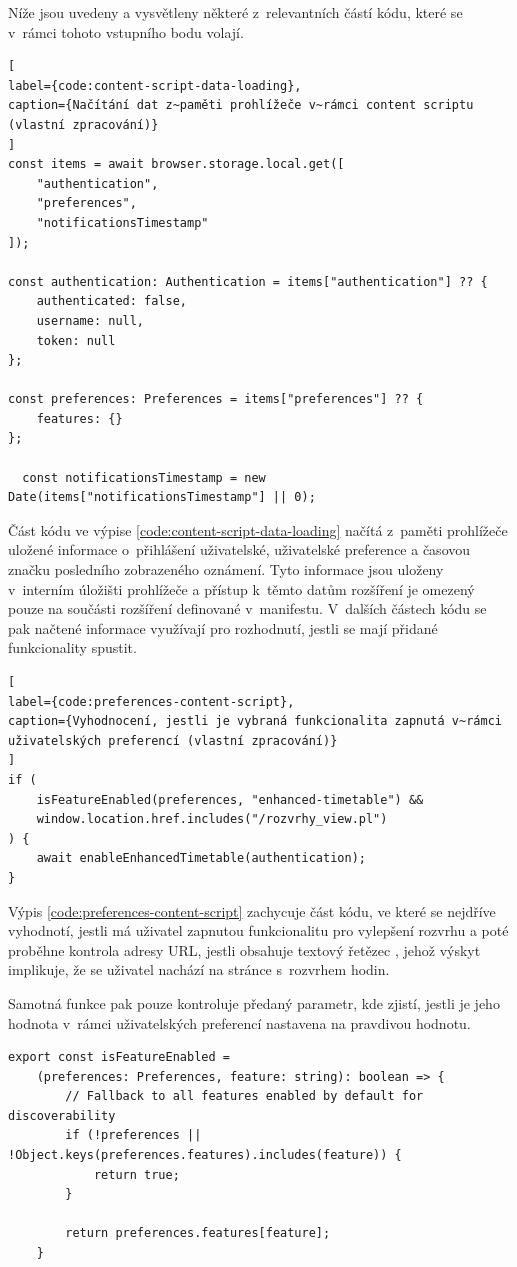 Níže jsou uvedeny a vysvětleny některé z~relevantních částí kódu, které se v~rámci tohoto vstupního bodu volají.

\begin{lstlisting}[
label={code:content-script-data-loading}, 
caption={Načítání dat z~paměti prohlížeče v~rámci content scriptu (vlastní zpracování)}
]
const items = await browser.storage.local.get([
    "authentication",
    "preferences",
    "notificationsTimestamp"
]);

const authentication: Authentication = items["authentication"] ?? {
    authenticated: false,
    username: null,
    token: null
};

const preferences: Preferences = items["preferences"] ?? {
    features: {}
};

  const notificationsTimestamp = new Date(items["notificationsTimestamp"] || 0);
\end{lstlisting}

 Část kódu ve výpise \ref{code:content-script-data-loading} načítá z~paměti prohlížeče uložené informace o~přihlášení uživatelské, uživatelské preference a časovou značku posledního zobrazeného oznámení. Tyto informace jsou uloženy v~interním úložišti prohlížeče a přístup k~těmto datům rozšíření je omezený pouze na součásti rozšíření definované v~manifestu.
V~dalších částech kódu se pak načtené informace využívají pro rozhodnutí, jestli se mají přidané funkcionality spustit.

\begin{lstlisting}[
label={code:preferences-content-script}, 
caption={Vyhodnocení, jestli je vybraná funkcionalita zapnutá v~rámci uživatelských preferencí (vlastní zpracování)}
]
if (
    isFeatureEnabled(preferences, "enhanced-timetable") && 
    window.location.href.includes("/rozvrhy_view.pl")
) {
    await enableEnhancedTimetable(authentication);
}
\end{lstlisting}

Výpis \ref{code:preferences-content-script} zachycuje část kódu, ve které se nejdříve vyhodnotí, jestli má uživatel zapnutou funkcionalitu pro vylepšení rozvrhu a poté proběhne kontrola adresy URL, jestli obsahuje textový řetězec , jehož výskyt implikuje, že se uživatel nachází na stránce s~rozvrhem hodin.

Samotná funkce  pak pouze kontroluje předaný parametr, kde zjistí, jestli je jeho hodnota v~rámci uživatelských preferencí nastavena na pravdivou hodnotu.

\newpage
\begin{lstlisting}[label={code:is-feature-enabled}, caption={Definice funkce \code{isFeatureEnabled} (vlastní zpracování)}]
export const isFeatureEnabled = 
    (preferences: Preferences, feature: string): boolean => {
        // Fallback to all features enabled by default for discoverability
        if (!preferences ||  !Object.keys(preferences.features).includes(feature)) {
            return true;
        }
    
        return preferences.features[feature];
    }
\end{lstlisting}

